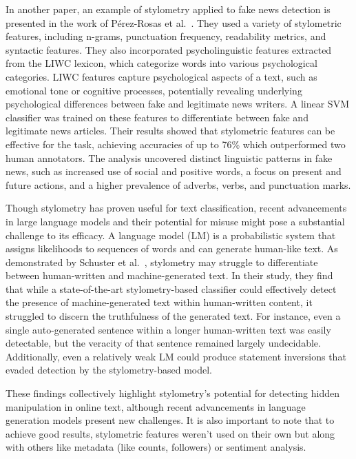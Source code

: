 \documentclass[twoside]{ctuthesis}
\theoremstyle{plain}
\theoremstyle{definition}
\theoremstyle{note}
\begin{document}
In another paper, an example of stylometry applied to fake news detection is presented in the work of Pérez-Rosas et al.~\cite{PerezRosas2018Stylometry}. They used a variety of stylometric features, including n-grams, punctuation frequency, readability metrics, and syntactic features. They also incorporated psycholinguistic features extracted from the LIWC lexicon, which categorize words into various psychological categories. LIWC features capture psychological aspects of a text, such as emotional tone or cognitive processes, potentially revealing underlying psychological differences between fake and legitimate news writers. A linear SVM classifier was trained on these features to differentiate between fake and legitimate news articles. Their results showed that stylometric features can be effective for the task, achieving accuracies of up to 76\% which outperformed two human annotators. The analysis uncovered distinct linguistic patterns in fake news, such as increased use of social and positive words, a focus on present and future actions, and a higher prevalence of adverbs, verbs, and punctuation marks.\par

Though stylometry has proven useful for text classification, recent advancements in large language models and their potential for misuse might pose a substantial challenge to its efficacy. A language model (LM) is a probabilistic system that assigns likelihoods to sequences of words and can generate human-like text. As demonstrated by Schuster et al.~\cite{Schuster2020}, stylometry may struggle to differentiate between human-written and machine-generated text. In their study, they find that while a state-of-the-art stylometry-based classifier could effectively detect the presence of machine-generated text within human-written content, it struggled to discern the truthfulness of the generated text. For instance, even a single auto-generated sentence within a longer human-written text was easily detectable, but the veracity of that sentence remained largely undecidable. Additionally, even a relatively weak LM could produce statement inversions that evaded detection by the stylometry-based model.

These findings collectively highlight stylometry's potential for detecting hidden manipulation in online text, although recent advancements in language generation models present new challenges. It is also important to note that to achieve good results, stylometric features weren't used on their own but along with others like metadata (like counts, followers) or sentiment analysis. \par
\end{document}
